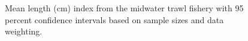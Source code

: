 \documentclass[
]{scrartcl}
\begin{document}
\begin{figure}[H]


\caption{\label{fig-meanlt-midt}Mean length (cm) index from the midwater
trawl fishery with 95 percent confidence intervals based on sample sizes
and data weighting.}

\end{figure}%
\end{document}

